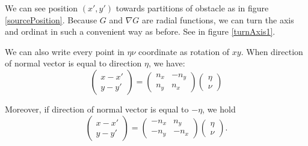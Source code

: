 \documentclass[a4paper,12pt]{article}
\begin{document}
We can see position $(x',y')$ towards partitions of obstacle as in figure \ref{sourcePosition}. Because $G$ and $\nabla G$ are radial functions,
we can turn the axis and ordinat in such a convenient way as before. See in figure \ref{turnAxis1}. 

We can also write every point in  $\eta\nu$ coordinate as rotation of $xy$. When direction of normal vector is equal to direction $\eta$, we have:
\begin{equation}
\left(\begin{array}{c}
      x-x' \\
      y-y'
    \end{array}\right)=\left(\begin{array}{cc}
      n_x & -n_y \\
      n_y & n_x
    \end{array}\right)\left(\begin{array}{c}
      \eta\\
      \nu
    \end{array}\right) \label{RotasixNu}
\end{equation}

Moreover, if direction of normal vector is equal to $-\eta$, we hold
\begin{equation}
\left(\begin{array}{c}
      x-x' \\
      y-y'
    \end{array}\right)=\left(\begin{array}{cc}
      -n_x & n_y \\
      -n_y & -n_x
    \end{array}\right)\left(\begin{array}{c}
      \eta\\
      \nu
    \end{array}\right) \label{RotasixNu1}.
\end{equation}
\end{document}
